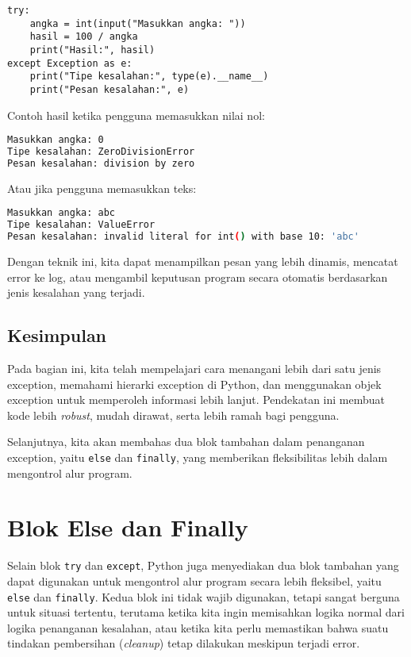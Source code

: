 \begin{lstlisting}[style=PythonStyle, caption={Menggunakan 'as' untuk menangkap objek exception}]
try:
    angka = int(input("Masukkan angka: "))
    hasil = 100 / angka
    print("Hasil:", hasil)
except Exception as e:
    print("Tipe kesalahan:", type(e).__name__)
    print("Pesan kesalahan:", e)
\end{lstlisting}

Contoh hasil ketika pengguna memasukkan nilai nol:

\begin{lstlisting}[language=bash]
Masukkan angka: 0
Tipe kesalahan: ZeroDivisionError
Pesan kesalahan: division by zero
\end{lstlisting}

Atau jika pengguna memasukkan teks:

\begin{lstlisting}[language=bash]
Masukkan angka: abc
Tipe kesalahan: ValueError
Pesan kesalahan: invalid literal for int() with base 10: 'abc'
\end{lstlisting}

Dengan teknik ini, kita dapat menampilkan pesan yang lebih dinamis, mencatat error ke log, atau mengambil keputusan program secara otomatis berdasarkan jenis kesalahan yang terjadi.

\subsection*{Kesimpulan}

Pada bagian ini, kita telah mempelajari cara menangani lebih dari satu jenis exception, memahami hierarki exception di Python, dan menggunakan objek exception untuk memperoleh informasi lebih lanjut.  
Pendekatan ini membuat kode lebih \textit{robust}, mudah dirawat, serta lebih ramah bagi pengguna.  

Selanjutnya, kita akan membahas dua blok tambahan dalam penanganan exception, yaitu \texttt{else} dan \texttt{finally}, yang memberikan fleksibilitas lebih dalam mengontrol alur program.


\section{Blok Else dan Finally}

Selain blok \texttt{try} dan \texttt{except}, Python juga menyediakan dua blok tambahan yang dapat digunakan untuk mengontrol alur program secara lebih fleksibel, yaitu \texttt{else} dan \texttt{finally}. Kedua blok ini tidak wajib digunakan, tetapi sangat berguna untuk situasi tertentu, terutama ketika kita ingin memisahkan logika normal dari logika penanganan kesalahan, atau ketika kita perlu memastikan bahwa suatu tindakan pembersihan (\textit{cleanup}) tetap dilakukan meskipun terjadi error.

